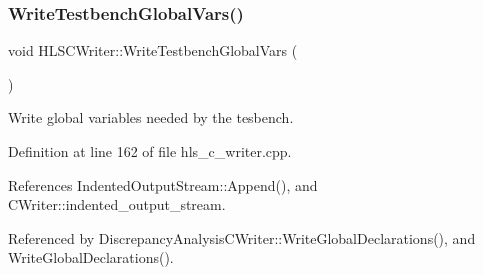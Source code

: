 \subsubsection{\texorpdfstring{Write\+Testbench\+Global\+Vars()}{WriteTestbenchGlobalVars()}}
{\footnotesize\ttfamily void H\+L\+S\+C\+Writer\+::\+Write\+Testbench\+Global\+Vars (\begin{DoxyParamCaption}{ }\end{DoxyParamCaption})\hspace{0.3cm}{\ttfamily [protected]}}



Write global variables needed by the tesbench. 



Definition at line 162 of file hls\+\_\+c\+\_\+writer.\+cpp.



References Indented\+Output\+Stream\+::\+Append(), and C\+Writer\+::indented\+\_\+output\+\_\+stream.



Referenced by Discrepancy\+Analysis\+C\+Writer\+::\+Write\+Global\+Declarations(), and Write\+Global\+Declarations().


